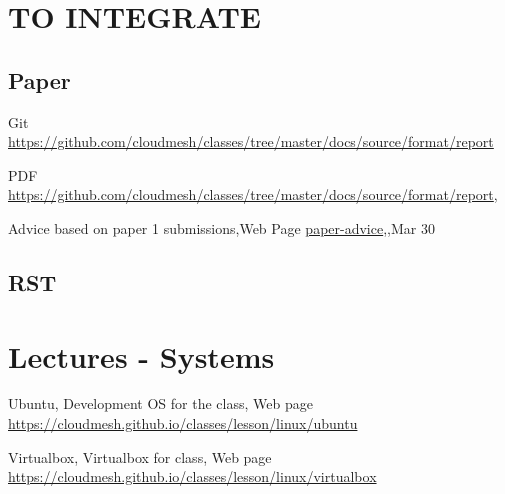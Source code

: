\section{TO INTEGRATE}

\begin{comment}
\subsection{Web Page}

Contributing to the Web Page \url{https://cloudmesh.github.io/classes/lesson/contrib/contributing.html},

\end{comment}

\subsection{Paper}



Git \url{https://github.com/cloudmesh/classes/tree/master/docs/source/format/report}

PDF \url{https://github.com/cloudmesh/classes/tree/master/docs/source/format/report},

Advice based on paper 1 submissions,Web Page \url{paper-advice},,Mar 30



\subsection{RST}

\section{Lectures - Systems}\label{lectures---systems}

Ubuntu, Development OS for the class, Web page \url{https://cloudmesh.github.io/classes/lesson/linux/ubuntu}

Virtualbox, Virtualbox for class, Web page \url{https://cloudmesh.github.io/classes/lesson/linux/virtualbox}





